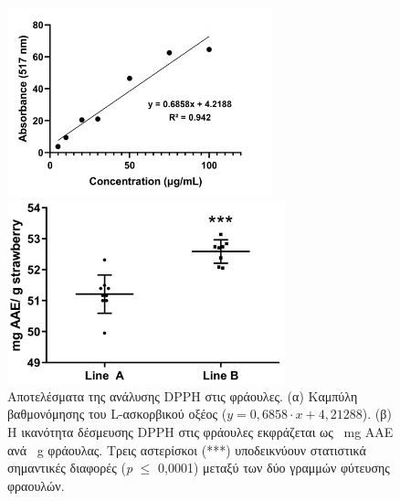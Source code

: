 \documentclass[12pt, a4paper]{report} %
\newcommand{\english}{\foreignlanguage{english}}
\begin{document}
\begin{figure}[H]
    \begin{minipage}[c]{.5\textwidth}
\centering
      \includegraphics[width=0.9\linewidth,height=155pt]{L_ascorbic.png}
      \caption*{\hspace{35pt}(α)}{}
    \end{minipage}%
    \begin{minipage}[c]{0.5\textwidth}
\centering
      \includegraphics[width=0.9\linewidth,height=150pt]{DPPH.png}
      \caption*{\hspace{35pt}(β)}{}
    \end{minipage}
    \caption{Αποτελέσματα της ανάλυσης \english{DPPH} στις φράουλες. (α) Καμπύλη βαθμονόμησης του \english{L}-ασκορβικού οξέος 
    ($y = 0,6858 \cdot x + 4,21288$). (β) Η ικανότητα δέσμευσης \english{DPPH} στις φράουλες εκφράζεται ως 
    \SI{}{\milli\gram} \english{AAE} ανά \SI{}{\gram} φράουλας. Τρεις αστερίσκοι (***) 
    υποδεικνύουν στατιστικά σημαντικές διαφορές (\english{\emph{p} $\leq$} 0,0001) μεταξύ των δύο γραμμών φύτευσης φραουλών.}
\label{fig_str_Lasc_DPPH}
\end{figure}
\end{document}

